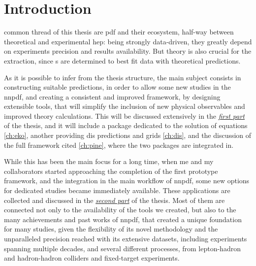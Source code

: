 
\cleardoublepage
{}

\chapter*{Introduction}
%
	{}

 common thread of this thesis are \acrfull{pdf} and their
ecosystem, half-way between theoretical and experimental \acrfull{hep}: being
strongly data-driven, they greatly depend on experiments precision and results
availability.
But theory is also crucial for the extraction, since \pdf{}s are determined to
best fit data with theoretical predictions.

As it is possible to infer from the thesis structure, the main subject consists
in constructing suitable predictions, in order to allow some new studies
in the \acrlong{nnpdf}, and creating a consistent and improved framework, by
designing extensible tools, that will simplify the inclusion of new physical
observables and improved theory calculations.
This will be discussed extensively in the \hyperref[part:th]{\textit{first
part}} of the thesis, and it will include a package dedicated to the solution
of \dglap equations \cref{ch:eko}, another providing \acrfull{dis} predictions
and grids \cref{ch:dis}, and the discussion of the full framework cited
\cref{ch:pine}, where the two packages are integrated in.

While this has been the main focus for a long time, when me and my
collaborators started approaching the completion of the first prototype
framework, and the integration in the main workflow of \acrshort{nnpdf}, some
new options for dedicated studies became immediately available. These
applications are collected and discussed in the
\hyperref[part:app]{\textit{second part}} of the thesis.
Most of them are connected not only to the availability of the tools we
created, but also to the many achievements and past works of \acrshort{nnpdf},
that created a unique foundation for many studies, given the flexibility of its
novel methodology and the unparalleled precision reached with its extensive
datasets, including experiments spanning multiple decades, and several
different processes, from lepton-hadron and hadron-hadron colliders and
fixed-target experiments.


